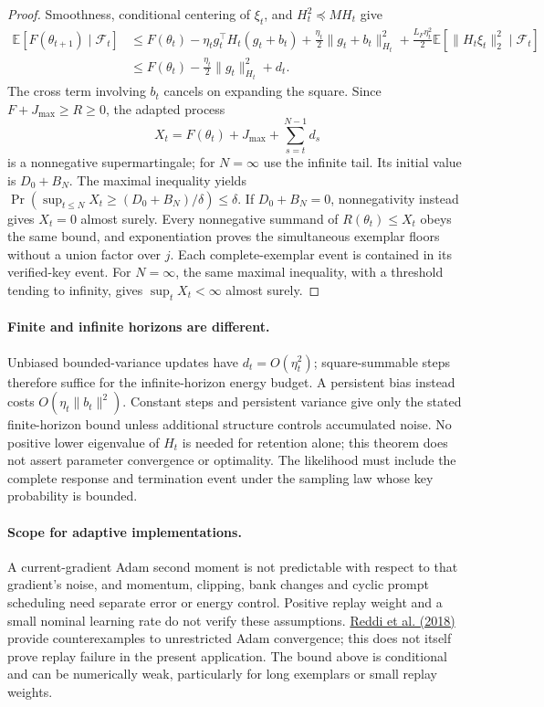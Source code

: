 \begin{proof}
Smoothness, conditional centering of $\xi_t$, and
$H_t^2\preceq MH_t$ give
\begin{align*}
 \mathbb E[F(\theta_{t+1})\mid\mathcal F_t]
 &\le F(\theta_t)-\eta_tg_t^\top H_t(g_t+b_t)
       +\frac{\eta_t}{2}\|g_t+b_t\|_{H_t}^2
       +\frac{L_F\eta_t^2}{2}
          \mathbb E[\|H_t\xi_t\|_2^2\mid\mathcal F_t]\\
 &\le F(\theta_t)-\frac{\eta_t}{2}\|g_t\|_{H_t}^2+d_t.
\end{align*}
The cross term involving $b_t$ cancels on expanding the square.
Since $F+J_{\max}\ge R\ge0$, the adapted process
\[
 X_t=F(\theta_t)+J_{\max}+\sum_{s=t}^{N-1}d_s
\]
is a nonnegative supermartingale; for $N=\infty$ use the infinite tail.
Its initial value is $D_0+B_N$. The maximal inequality yields
$\Pr(\sup_{t\le N}X_t\ge(D_0+B_N)/\delta)\le\delta$.
If $D_0+B_N=0$, nonnegativity instead gives $X_t=0$ almost surely.
Every nonnegative summand of $R(\theta_t)\le X_t$ obeys the same bound,
and exponentiation proves the simultaneous exemplar floors without a
union factor over $j$. Each complete-exemplar event is contained in its
verified-key event. For $N=\infty$, the same maximal inequality, with a
threshold tending to infinity, gives $\sup_tX_t<\infty$ almost surely.
\end{proof}

\paragraph{Finite and infinite horizons are different.}
Unbiased bounded-variance updates have $d_t=O(\eta_t^2)$; square-summable
steps therefore suffice for the infinite-horizon energy budget.
A persistent bias instead costs $O(\eta_t\|b_t\|^2)$.
Constant steps and persistent variance give only the stated finite-horizon
bound unless additional structure controls accumulated noise.
No positive lower eigenvalue of $H_t$ is needed for retention alone;
this theorem does not assert parameter convergence or optimality.
The likelihood must include the complete response and termination event
under the sampling law whose key probability is bounded.

\paragraph{Scope for adaptive implementations.}
A current-gradient Adam second moment is not predictable with respect to
that gradient's noise, and momentum, clipping, bank changes and cyclic
prompt scheduling need separate error or energy control. Positive replay
weight and a small nominal learning rate do not verify these assumptions.
\href{https://arxiv.org/html/1904.09237v1}{Reddi et al. (2018)} provide
counterexamples to unrestricted Adam convergence; this does not itself
prove replay failure in the present application. The bound above is
conditional and can be numerically weak, particularly for long exemplars
or small replay weights.
